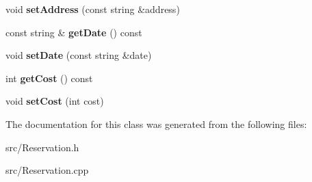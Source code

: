 \begin{DoxyCompactItemize}
void {\bfseries set\+Address} (const string \&address)
\item 
\mbox{\label{class_reservation_a41a54af4ed523eaabf62507b15d4df50}} 
const string \& {\bfseries get\+Date} () const
\item 
\mbox{\label{class_reservation_ab742bc4c1a5e33f7a3ffbf2f9393076d}} 
void {\bfseries set\+Date} (const string \&date)
\item 
\mbox{\label{class_reservation_a107d082624892399e930637d32524993}} 
int {\bfseries get\+Cost} () const
\item 
\mbox{\label{class_reservation_a54d871fc33a39b60f3b99b20e1bf6880}} 
void {\bfseries set\+Cost} (int cost)
\end{DoxyCompactItemize}


The documentation for this class was generated from the following files\+:\begin{DoxyCompactItemize}
\item 
src/Reservation.\+h\item 
src/Reservation.\+cpp\end{DoxyCompactItemize}
